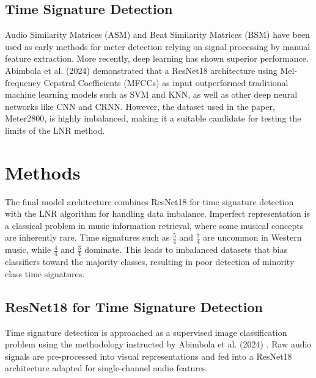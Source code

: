 \documentclass{article}
\begin{document}
\subsection{Time Signature Detection}

Audio Similarity Matrices (ASM) and Beat Similarity Matrices (BSM) have been used as early methods for meter detection relying on signal processing by manual feature extraction. More recently, deep learning has shown superior performance. Abimbola et al. (2024) \cite{audio_resnet} demonstrated that a ResNet18 architecture using Mel-frequency Cepstral Coefficients (MFCCs) as input outperformed traditional machine learning models such as SVM and KNN, as well as other deep neural networks like CNN and CRNN. However, the dataset used in the paper, Meter2800, is highly imbalanced, making it a suitable candidate for testing the limits of the LNR method.

\section{Methods}

The final model architecture combines ResNet18 for time signature detection with the LNR algorithm for handling data imbalance. Imperfect representation is a classical problem in music information retrieval, where some musical concepts are inherently rare. Time signatures such as $\frac{5}{4}$ and $\frac{7}{4}$ are uncommon in Western music, while $\frac{4}{4}$ and $\frac{3}{4}$ dominate. This leads to imbalanced datasets that bias classifiers toward the majority classes, resulting in poor detection of minority class time signatures.


\subsection{ResNet18 for Time Signature Detection}

Time signature detection is approached as a supervised image classification problem using the methodology instructed by Abimbola et al. (2024) \cite{audio_resnet}. Raw audio signals are pre-processed into visual representations and fed into a ResNet18 architecture adapted for single-channel audio features.
\end{document}
